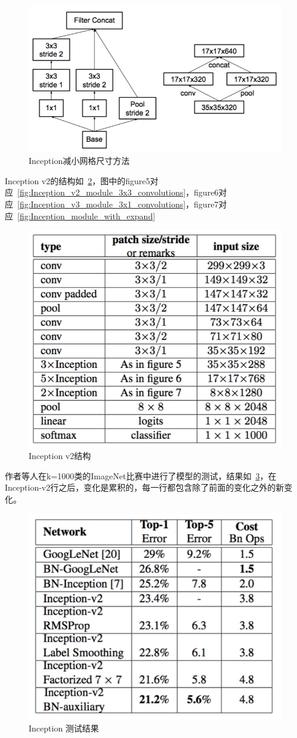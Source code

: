 \begin{figure}[htbp]
	\centering
	\includegraphics[width=\linewidth]{readings_figures/Inception_grid_size.png}
	\caption{Inception减小网格尺寸方法}
	\label{fig:Inception_grid_size}
\end{figure}

Inception v2的结构如~\ref{fig:Inception_v2_module}，图中的figure5对应~\ref{fig:Inception_v2_module_3x3_convolutions}，figure6对应~\ref{fig:Inception_v3_module_3x1_convolutions}，figure7对应~\ref{fig:Inception_module_with_expand}

\begin{figure}[htbp]
	\centering
	\includegraphics[width=0.5\linewidth]{readings_figures/Inception_v2_module.png}
	\caption{Inception v2结构}
	\label{fig:Inception_v2_module}
\end{figure}

作者等人在k=1000类的ImageNet比赛中进行了模型的测试，结果如~\ref{fig:Inception_v2_v3_result}，在Inception-v2行之后，变化是累积的，每一行都包含除了前面的变化之外的新变化。

\begin{figure}[htbp]
	\centering
	\includegraphics[width=0.5\linewidth]{readings_figures/Inception_v2_v3_result.png}
	\caption{Inception 测试结果}
	\label{fig:Inception_v2_v3_result}
\end{figure}

